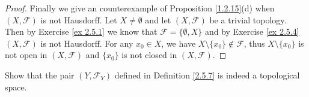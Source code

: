 \begin{proof}
    Finally we give an counterexample of Proposition \ref{1.2.15}(d) when \((X, \mathcal{F})\) is not Hausdorff.
    Let \(X \neq \emptyset\) and let \((X, \mathcal{F})\) be a trivial topology.
    Then by Exercise \ref{ex 2.5.1} we know that \(\mathcal{F} = \{\emptyset, X\}\) and by Exercise \ref{ex 2.5.4} \((X, \mathcal{F})\) is not Hausdorff.
    For any \(x_0 \in X\), we have \(X \setminus \{x_0\} \notin \mathcal{F}\), thus \(X \setminus \{x_0\}\) is not open in \((X, \mathcal{F})\) and \(\{x_0\}\) is not closed in \((X, \mathcal{F})\).
\end{proof}

\begin{exercise}\label{ex 2.5.12}
    Show that the pair \((Y, \mathcal{F}_Y)\) defined in Definition \ref{2.5.7} is indeed a topological space.
\end{exercise}

